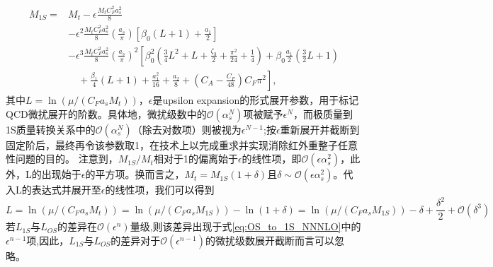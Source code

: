 \begin{equation}
\begin{aligned}
M_{1 S}= & M_t-\epsilon \frac{M_t C_F^2 a_s^2}{8} \\
& -\epsilon^2 \frac{M_t C_F^2 a_s^2}{8}\left(\frac{a_s}{\pi}\right)\left[\beta_0(L+1)+\frac{a_1}{2}\right] \\
& -\epsilon^3 \frac{M_t C_F^2 a_s^2}{8}\left(\frac{a_s}{\pi}\right)^2\left[\beta_0^2\left(\frac{3}{4} L^2+L+\frac{\zeta_3}{2}+\frac{\pi^2}{24}+\frac{1}{4}\right)+\beta_0 \frac{a_1}{2}\left(\frac{3}{2} L+1\right)\right. \\
& \left.\quad+\frac{\beta_1}{4}(L+1)+\frac{a_1^2}{16}+\frac{a_2}{8}+\left(C_A-\frac{C_F}{48}\right) C_F \pi^2\right],
\end{aligned}
\label{eq:OS_to_1S_NNNLO}
\end{equation}
其中$L=\ln \left(\mu/\left(C_F a_s M_t\right)\right)$，$\epsilon$是upsilon expansion的形式展开参数，用于标记QCD微扰展开的阶数。具体地，微扰级数中的$\mathcal{O}(\alpha_s^N)$项被赋予$\epsilon^N$，而极质量到1S质量转换关系中的$\mathcal{O}(\alpha_s^N)$（除去对数项）则被视为$\epsilon^{N-1}$;按$\epsilon$重新展开并截断到固定阶后，最终再令该参数取1，在技术上以完成重求并实现消除红外重整子任意性问题的目的。
注意到，$M_{1S}/M_t$相对于1的偏离始于$\epsilon$的线性项，即$\mathcal{O}(\epsilon \alpha_s^2)$，此外，L的出现始于$\epsilon$的平方项。换而言之，$M_{t}=M_{1S}(1+\delta)$且$\delta \sim \mathcal{O}(\epsilon \alpha_s^2)$。代入L的表达式并展开至$\epsilon$的线性项，我们可以得到
\begin{equation}
    L=\ln \left(\mu/\left(C_F a_s M_t\right)\right)=\ln\left(\mu/\left(C_F a_s M_{1S}\right)\right)-\ln\left(1+\delta\right)=\ln\left(\mu/\left(C_F a_s M_{1S}\right)\right)-\delta+\frac{\delta^2}{2}+\mathcal{O}(\delta^3)
\end{equation}
若$L_{1S}$与$L_{OS}$的差异在$\mathcal{O}(\epsilon^n)$量级,则该差异出现于式\eqref{eq:OS_to_1S_NNNLO}中的$\epsilon^{n-1}$项,因此，$L_{1S}$与$L_{OS}$的差异对于$\mathcal{O}(\epsilon^{n-1})$的微扰级数展开截断而言可以忽略。

